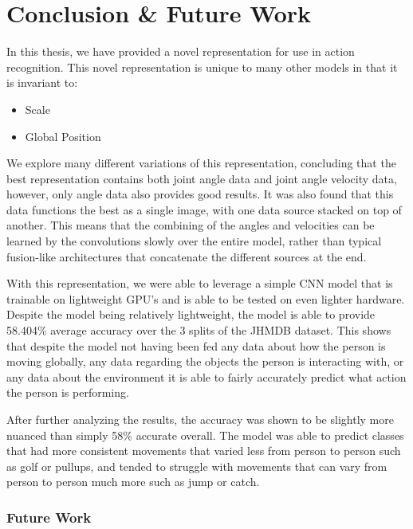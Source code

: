 
\chapter{Conclusion \& Future Work} %

\label{Conclusion}

In this thesis, we have provided a novel representation for use in action recognition. This novel representation is unique to many other models in that it is invariant to:

\begin{itemize}
	\item Scale
	\item Global Position
\end{itemize}

We explore many different variations of this representation, concluding that the best representation contains both joint angle data and joint angle velocity data, however, only angle data also provides good results. It was also found that this data functions the best as a single image, with one data source stacked on top of another. This means that the combining of the angles and velocities can be learned by the convolutions slowly over the entire model, rather than typical fusion-like architectures that concatenate the different sources at the end.

With this representation, we were able to leverage a simple CNN model that is trainable on lightweight GPU's and is able to be tested on even lighter hardware. Despite the model being relatively lightweight, the model is able to provide 58.404\% average accuracy over the 3 splits of the JHMDB dataset. This shows that despite the model not having been fed any data about how the person is moving globally, any data regarding the objects the person is interacting with, or any data about the environment it is able to fairly accurately predict what action the person is performing.

After further analyzing the results, the accuracy was shown to be slightly more nuanced than simply 58\% accurate overall. The model was able to predict classes that had more consistent movements that varied less from person to person such as golf or pullups, and tended to struggle with movements that can vary from person to person much more such as jump or catch.

\subsection{Future Work}

